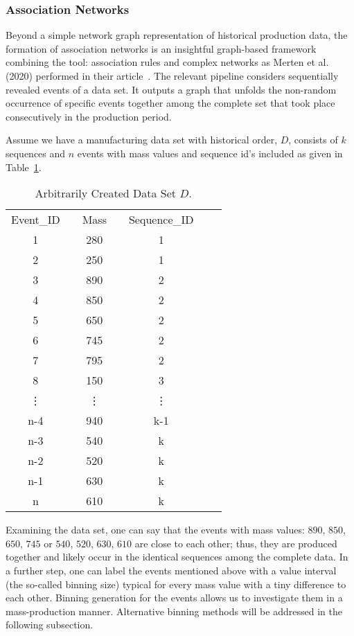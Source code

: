 \subsubsection*{Association Networks}
%
Beyond a simple network graph representation of historical production data, the formation of association networks is an insightful graph-based framework combining the tool: association rules and complex networks as Merten et al. (2020) performed in their article~\cite{MERTEN2020}. The relevant pipeline considers sequentially revealed events of a data set. It outputs a graph that unfolds the non-random occurrence of specific events together among the complete set that took place consecutively in the production period.

Assume we have a manufacturing data set with historical order, $D$, consists of $k$ sequences and $n$ events with mass values and sequence id's included as given in Table~\ref{Tab:D-dataset}.
\renewcommand{\arraystretch}{1.1}
\begin{table}[hb!]
	\centering
	\begin{tabular}{|cccccc|l}
		\cline{1-6}
		Event\_ID && Mass 	&& Sequence\_ID &  \\ \cline{1-6}
		1 	      && 280  	&& 1 		   	&  \\
		2 		  && 250	&& 1 		   	&  \\
		3 	      && 890	&& 2 		    &  \\
		4 		  && 850	&& 2 		    &  \\
		5 	      && 650	&& 2   		    &  \\
		6 	      && 745	&& 2 		    &  \\
		7 		  && 795	&& 2 		    &  \\
		8 		  && 150	&& 3 		    &  \\
		\vdots	  && \vdots && \vdots 	    &  \\
		n-4 	  && 940  	&& k-1	 	    &  \\
		n-3 	  && 540  	&& k			&  \\
		n-2 	  && 520	&& k 		    &  \\
		n-1       && 630	&& k 		    &  \\
		n 		  && 610	&& k 		    &  \\ \cline{1-6}
	\end{tabular}
	\caption{Arbitrarily Created Data Set $D$.}
	\label{Tab:D-dataset}
\end{table}

Examining the data set, one can say that the events with mass values: $890$, $850$, $650$, $745$ or $540$, $520$, $630$, $610$ are close to each other; thus, they are produced together and likely occur in the identical sequences among the complete data. In a further step, one can label the events mentioned above with a value interval (the so-called binning size) typical for every mass value with a tiny difference to each other. Binning generation for the events allows us to investigate them in a mass-production manner. Alternative binning methods will be addressed in the following subsection. 

